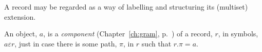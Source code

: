 A record may be
regarded as a way of labelling and structuring its (multiset) extension.

An object, $a$, is a \textit{component} (Chapter~\ref{ch:gram}, p.~\pageref{pg:component}) of a record, $r$, in symbols,
$a\varepsilon r$, just in case there is some path, $\pi$, in $r$ such
that $r.\pi=a$.  %



